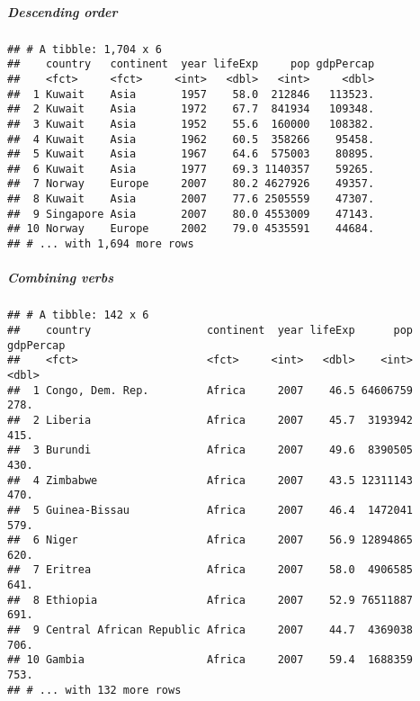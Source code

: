 \documentclass[]{article}
\newenvironment{Shaded}{\begin{snugshade}}{\end{snugshade}}
\newcommand{\KeywordTok}[1]{\textcolor[rgb]{0.13,0.29,0.53}{\textbf{#1}}}
\newcommand{\DecValTok}[1]{\textcolor[rgb]{0.00,0.00,0.81}{#1}}
\newcommand{\StringTok}[1]{\textcolor[rgb]{0.31,0.60,0.02}{#1}}
\newcommand{\OperatorTok}[1]{\textcolor[rgb]{0.81,0.36,0.00}{\textbf{#1}}}
\newcommand{\NormalTok}[1]{#1}
\let\oldsubparagraph\subparagraph
\renewcommand{\subparagraph}[1]{\oldsubparagraph{#1}\mbox{}}
\begin{document}
\subparagraph{Descending order}\label{descending-order}

\begin{Shaded}
\end{Shaded}

\begin{verbatim}
## # A tibble: 1,704 x 6
##    country   continent  year lifeExp     pop gdpPercap
##    <fct>     <fct>     <int>   <dbl>   <int>     <dbl>
##  1 Kuwait    Asia       1957    58.0  212846   113523.
##  2 Kuwait    Asia       1972    67.7  841934   109348.
##  3 Kuwait    Asia       1952    55.6  160000   108382.
##  4 Kuwait    Asia       1962    60.5  358266    95458.
##  5 Kuwait    Asia       1967    64.6  575003    80895.
##  6 Kuwait    Asia       1977    69.3 1140357    59265.
##  7 Norway    Europe     2007    80.2 4627926    49357.
##  8 Kuwait    Asia       2007    77.6 2505559    47307.
##  9 Singapore Asia       2007    80.0 4553009    47143.
## 10 Norway    Europe     2002    79.0 4535591    44684.
## # ... with 1,694 more rows
\end{verbatim}

\subparagraph{Combining verbs}\label{combining-verbs}

\begin{Shaded}
\end{Shaded}

\begin{verbatim}
## # A tibble: 142 x 6
##    country                  continent  year lifeExp      pop gdpPercap
##    <fct>                    <fct>     <int>   <dbl>    <int>     <dbl>
##  1 Congo, Dem. Rep.         Africa     2007    46.5 64606759      278.
##  2 Liberia                  Africa     2007    45.7  3193942      415.
##  3 Burundi                  Africa     2007    49.6  8390505      430.
##  4 Zimbabwe                 Africa     2007    43.5 12311143      470.
##  5 Guinea-Bissau            Africa     2007    46.4  1472041      579.
##  6 Niger                    Africa     2007    56.9 12894865      620.
##  7 Eritrea                  Africa     2007    58.0  4906585      641.
##  8 Ethiopia                 Africa     2007    52.9 76511887      691.
##  9 Central African Republic Africa     2007    44.7  4369038      706.
## 10 Gambia                   Africa     2007    59.4  1688359      753.
## # ... with 132 more rows
\end{verbatim}
\end{document}
